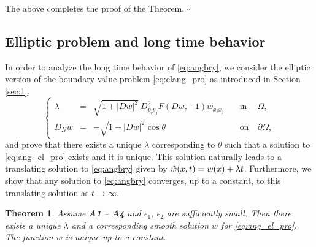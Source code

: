 \documentclass[12pt]{article}
\numberwithin{equation}{section}
\theoremstyle{plain}
\newtheorem{theorem}{Theorem}[section]
\theoremstyle{definition}
\theoremstyle{remark}
\begin{document}
The above completes the proof of the Theorem.
\hfill$\square$

\subsection{Elliptic problem and long time behavior}\label{sec:longtimeangle}
In order to analyze the long time behavior of \eqref{eq:angbry},  we consider the elliptic version of the boundary value problem \eqref{eq:elang_pro} as introduced in Section \ref{sec:1},
\begin{equation} \label{eq:ang_el_pro}
\left\{ \begin{array}{cllcl}
     \lambda & = & \sqrt{1+|Dw|^2} \ D^2_{p_i p_j} F (Dw,-1) w_{x_i x_j}    
     \quad & \text{in} & \ \Omega,  \\
     D_N w & = & - \sqrt{1+|Dw|^2} \cos \theta \quad & \text{on} & \ \partial \Omega ,
\end{array} \right.
\end{equation}
and prove that there exists a unique $\lambda$ corresponding to $\theta$ such that a solution to \eqref{eq:ang_el_pro} exists and it is unique. This solution naturally leads to a translating solution to \eqref{eq:angbry} given by 
$\Tilde{w}(x,t) = w(x) + \lambda t$. Furthermore, we show that any solution to \eqref{eq:angbry} converges, up to a constant, to this translating solution as $t \rightarrow \infty$.
\begin{theorem} \label{thm:3.3}
    Assume {\bf A1} -- {\bf A4} and 
$\epsilon_1$, $\epsilon_2$ are sufficiently small. Then there exists a unique $\lambda$ and a corresponding smooth solution $w$ for \eqref{eq:ang_el_pro}. The function $w$ is unique up to a constant. 
\end{theorem}
\end{document}
